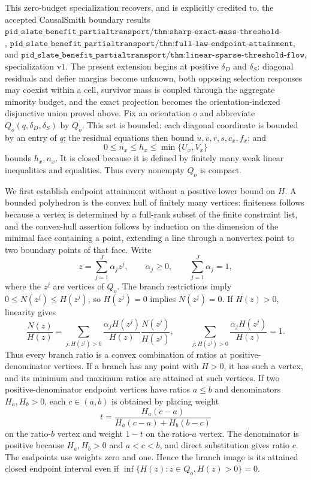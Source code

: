 This zero-budget specialization recovers, and is explicitly credited to, the accepted CausalSmith boundary results \(\texttt{pid\_slate\_benefit\_partialtransport/thm:sharp-exact-mass-threshold-interval}\), \(\texttt{pid\_slate\_benefit\_partialtransport/thm:full-law-endpoint-attainment}\), and \(\texttt{pid\_slate\_benefit\_partialtransport/thm:linear-sparse-threshold-flow}\), specialization \(\mathrm{v1}\). The present extension begins at positive \(\delta_D\) and \(\delta_S\): diagonal residuals and defier margins become unknown, both opposing selection responses may coexist within a cell, survivor mass is coupled through the aggregate minority budget, and the exact projection becomes the orientation-indexed disjunctive union proved above.
Fix an orientation \(o\) and abbreviate \(Q_o(q,\delta_D,\delta_S)\) by \(Q_o\). This set is bounded: each diagonal coordinate is bounded by an entry of \(q\); the residual equations then bound \(u,v,r,s,c_x,f_x\); and
\[
 0\leq n_x\leq h_x\leq\min\{U_x,V_x\}
\]
bounds \(h_x,n_x\). It is closed because it is defined by finitely many weak linear inequalities and equalities. Thus every nonempty \(Q_o\) is compact.

We first establish endpoint attainment without a positive lower bound on \(H\). A bounded polyhedron is the convex hull of finitely many vertices: finiteness follows because a vertex is determined by a full-rank subset of the finite constraint list, and the convex-hull assertion follows by induction on the dimension of the minimal face containing a point, extending a line through a nonvertex point to two boundary points of that face. Write
\[
 z=\sum_{j=1}^J\alpha_jz^j,
 \qquad \alpha_j\geq0,
 \qquad \sum_{j=1}^J\alpha_j=1,
\]
where the \(z^j\) are vertices of \(Q_o\). The branch restrictions imply \(0\leq N(z^j)\leq H(z^j)\), so \(H(z^j)=0\) implies \(N(z^j)=0\). If \(H(z)>0\), linearity gives
\[
 \frac{N(z)}{H(z)}
 =\sum_{j:H(z^j)>0}
 \frac{\alpha_jH(z^j)}{H(z)}
 \frac{N(z^j)}{H(z^j)},
 \qquad
 \sum_{j:H(z^j)>0}\frac{\alpha_jH(z^j)}{H(z)}=1.
\]
Thus every branch ratio is a convex combination of ratios at positive-denominator vertices. If a branch has any point with \(H>0\), it has such a vertex, and its minimum and maximum ratios are attained at such vertices. If two positive-denominator endpoint vertices have ratios \(a\leq b\) and denominators \(H_a,H_b>0\), each \(c\in(a,b)\) is obtained by placing weight
\[
 t=\frac{H_a(c-a)}{H_a(c-a)+H_b(b-c)}
\]
on the ratio-\(b\) vertex and weight \(1-t\) on the ratio-\(a\) vertex. The denominator is positive because \(H_a,H_b>0\) and \(a<c<b\), and direct substitution gives ratio \(c\). The endpoints use weights zero and one. Hence the branch image is its attained closed endpoint interval even if \(\inf\{H(z):z\in Q_o,H(z)>0\}=0\).

